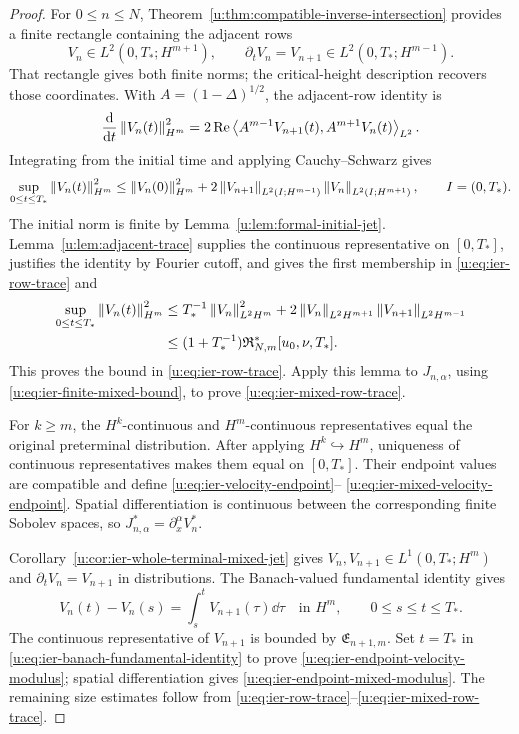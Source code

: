 \begin{proof}
For \(0\le n\le N\), Theorem~\ref{u:thm:compatible-inverse-intersection}
provides a finite rectangle containing the adjacent rows
\[
 V_n\in L^2(0,T_*;H^{m+1}),
 \qquad
 \partial_tV_n=V_{n+1}\in L^2(0,T_*;H^{m-1}).
\]
That rectangle gives both finite norms; the critical-height
description recovers those coordinates.
With \(A=(1-\Delta)^{1/2}\), the adjacent-row identity is
\[
 \frac{\mathrm d}{\mathrm dt}\left\lVert V_n(t)\right\rVert_{H^m}^2
 =2\operatorname{Re}\left\langle A^{m-1}V_{n+1}(t),A^{m+1}V_n(t)\right\rangle_{L^2}.
\]
Integrating from the initial time and applying Cauchy--Schwarz gives
\begin{equation}
 \sup_{0\le t\le T_*}\left\lVert V_n(t)\right\rVert_{H^m}^2
 \le\left\lVert V_n(0)\right\rVert_{H^m}^2
 +2\left\lVert V_{n+1}\right\rVert_{L^2(I;H^{m-1})}
    \left\lVert V_n\right\rVert_{L^2(I;H^{m+1})},
 \qquad I=(0,T_*).
 \label{u:eq:ier-initial-row-trace-bound}
\end{equation}
The initial norm is finite by Lemma~\ref{u:lem:formal-initial-jet}.
Lemma~\ref{u:lem:adjacent-trace} supplies the continuous representative
on \([0,T_*]\), justifies the identity by Fourier cutoff, and gives the
first membership in
\eqref{u:eq:ier-row-trace} and
\begin{align*}
 \sup_{0\le t\le T_*}\left\lVert V_n(t)\right\rVert_{H^m}^2
 &\le T_*^{-1}\left\lVert V_n\right\rVert_{L^2H^m}^2
 +2\left\lVert V_n\right\rVert_{L^2H^{m+1}}\left\lVert V_{n+1}\right\rVert_{L^2H^{m-1}}\\
 &\le(1+T_*^{-1})\mathfrak R_{N,m}^*[u_0,\nu,T_*].
\end{align*}
This proves the bound in \eqref{u:eq:ier-row-trace}.  Apply this lemma to
\(J_{n,\alpha}\), using \eqref{u:eq:ier-finite-mixed-bound}, to prove
\eqref{u:eq:ier-mixed-row-trace}.

For \(k\ge m\), the \(H^k\)-continuous and \(H^m\)-continuous
representatives equal the original preterminal distribution.  After applying
\(H^k\hookrightarrow H^m\), uniqueness of continuous representatives makes
them equal on \([0,T_*]\).  Their endpoint values are compatible and define
\eqref{u:eq:ier-velocity-endpoint}--%
\eqref{u:eq:ier-mixed-velocity-endpoint}.  Spatial differentiation is
continuous between the corresponding finite Sobolev spaces, so
\(J_{n,\alpha}^*=\partial_x^\alpha V_n^*\).

Corollary~\ref{u:cor:ier-whole-terminal-mixed-jet} gives
\(V_n,V_{n+1}\in L^1(0,T_*;H^m)\) and
\(\partial_tV_n=V_{n+1}\) in distributions.  The Banach-valued fundamental
identity gives
\begin{equation}
 V_n(t)-V_n(s)=\int_s^tV_{n+1}(\tau)\dd\tau
 \quad\text{in }H^m,
 \qquad0\le s\le t\le T_*.
 \label{u:eq:ier-banach-fundamental-identity}
\end{equation}
The continuous representative of \(V_{n+1}\) is bounded by
\(\mathfrak E_{n+1,m}\).  Set \(t=T_*\) in
\eqref{u:eq:ier-banach-fundamental-identity} to prove
\eqref{u:eq:ier-endpoint-velocity-modulus}; spatial differentiation gives
\eqref{u:eq:ier-endpoint-mixed-modulus}.  The remaining size estimates follow
from \eqref{u:eq:ier-row-trace}--\eqref{u:eq:ier-mixed-row-trace}.


\end{proof}
